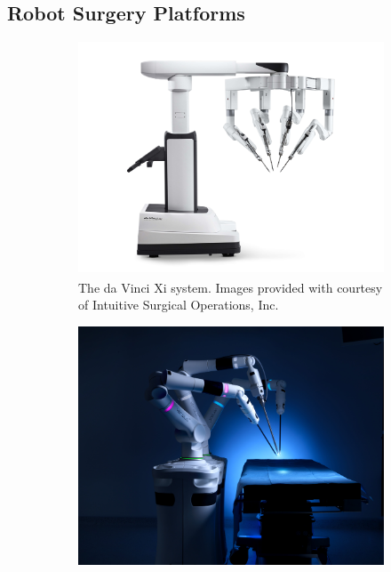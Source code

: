 \subsection{Robot Surgery Platforms}
\label{in:sec:robot_surgery_platforms}
\begin{figure}[h    tb]
    \centering
    \begin{subfigure}[b]{0.49\textwidth}
        \centering
        \includegraphics[height=0.23\textheight]{introduction/img/JPG_Large-DV_SYS_Xi_PatientCart_PRF_RGB-min.jpg}
        \caption{The da Vinci\textsuperscript{\textregistered} Xi system. Images provided with courtesy of  Intuitive Surgical Operations, Inc.}
        \label{in:fig:da_vinci}
    \end{subfigure}
    \begin{subfigure}[b]{0.49\textwidth}
        \centering
        \includegraphics[height=0.23\textheight]{introduction/img/Product-Versius-3-Arm-Setup-B.jpg}

\end{subfigure}
\end{figure}
